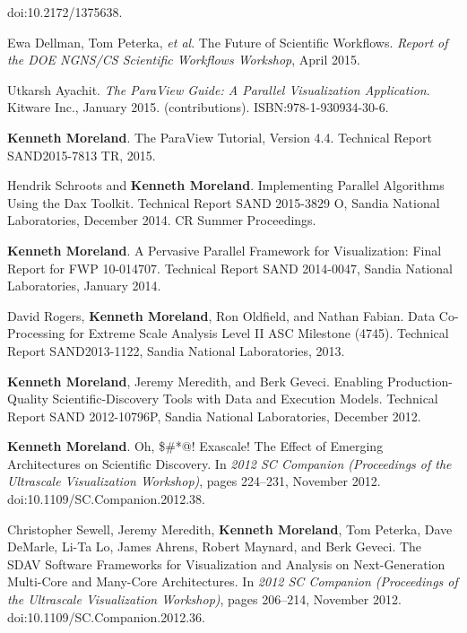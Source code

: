 \begin{enumerate}[label={[\arabic*]}, left=0pt]
  doi:10.2172/1375638.
\item  %
  Ewa Dellman, Tom Peterka, \emph{et al}.
  The Future of Scientific Workflows.
\emph{Report of the DOE NGNS/CS Scientific Workflows Workshop}, April 2015.
\item  %
  Utkarsh Ayachit.
  \emph{The {ParaView} Guide: A Parallel Visualization Application}.
Kitware Inc., January 2015.
(contributions).  ISBN:978-1-930934-30-6.
\item  %
  \textbf{Kenneth Moreland}.
  The {ParaView} Tutorial, Version 4.4.
Technical Report SAND2015-7813 TR, 2015.
\item  %
  Hendrik Schroots and \textbf{Kenneth Moreland}.
  Implementing Parallel Algorithms Using the Dax Toolkit.
Technical Report SAND 2015-3829 O, Sandia National Laboratories, December 2014.
CR Summer Proceedings.\item  %
  \textbf{Kenneth Moreland}.
  A Pervasive Parallel Framework for Visualization: Final Report for FWP 10-014707.
Technical Report SAND 2014-0047, Sandia National Laboratories, January 2014.
\item  %
  David Rogers, \textbf{Kenneth Moreland}, Ron Oldfield, and Nathan Fabian.
  Data Co-Processing for Extreme Scale Analysis Level {II} {ASC} Milestone (4745).
Technical Report SAND2013-1122, Sandia National Laboratories, 2013.
\item  %
  \textbf{Kenneth Moreland}, Jeremy Meredith, and Berk Geveci.
  Enabling Production-Quality Scientific-Discovery Tools with Data and Execution Models.
Technical Report SAND 2012-10796P, Sandia National Laboratories, December 2012.
\item  %
  \textbf{Kenneth Moreland}.
  {Oh, \$\#*@! Exascale!} {The} Effect of Emerging Architectures on Scientific Discovery.
  In \emph{2012 SC Companion (Proceedings of the Ultrascale Visualization Workshop)}, pages 224--231, November 2012.
  doi:10.1109/SC.Companion.2012.38.
\item  %
  Christopher Sewell, Jeremy Meredith, \textbf{Kenneth Moreland}, Tom Peterka, Dave DeMarle, Li-Ta Lo, James Ahrens, Robert Maynard, and Berk Geveci.
  The {SDAV} Software Frameworks for Visualization and Analysis on Next-Generation Multi-Core and Many-Core Architectures.
  In \emph{2012 SC Companion (Proceedings of the Ultrascale Visualization Workshop)}, pages 206--214, November 2012.
  doi:10.1109/SC.Companion.2012.36.
\item  %

\end{enumerate}
